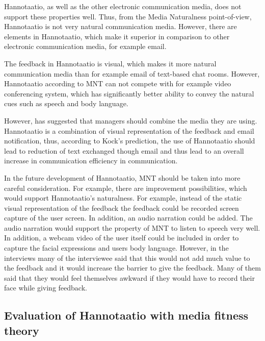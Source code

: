 \documentclass[english,12pt,a4paper,pdftex]{article}
\begin{document}
Hannotaatio, as well as the other electronic communication media, does not support these properties well. Thus, from the Media Naturalness point-of-view, Hannotaatio is not very natural communication media. However, there are elements in Hannotaatio, which make it superior in comparison to other electronic communication media, for example email.

The feedback in Hannotaatio is visual, which makes it more natural communication media than for example email of text-based chat rooms. However, Hannotaatio according to \ac{MNT} can not compete with for example video conferencing system, which has significantly better ability to convey the natural cues such as speech and body language.

However, \citep{kock2007} has suggested that managers should combine the media they are using. Hannotaatio is a combination of visual representation of the feedback and email notification, thus, according to Kock's prediction, the use of Hannotaatio should lead to reduction of text exchanged though email and thus lead to an overall increase in communication efficiency in communication.

In the future development of Hannotaatio, \ac{MNT} should be taken into more careful consideration. For example, there are improvement possibilities, which would support Hannotaatio's naturalness. For example, instead of the static visual representation of the feedback the feedback could be recorded screen capture of the user screen. In addition, an audio narration could be added. The audio narration would support the property of \ac{MNT} to listen to speech very well. In addition, a webcam video of the user itself could be included in order to capture the facial expressions and users body language. However, in the interviews many of the interviewee said that this would not add much value to the feedback and it would increase the barrier to give the feedback. Many of them said that they would feel themselves awkward if they would have to record their face while giving feedback. 

\subsection{Evaluation of Hannotaatio with media fitness theory}
\label{sec:hannotaatio_mft}
\end{document}

